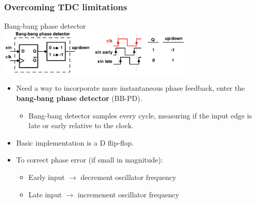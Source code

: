 \documentclass[t, screen, aspectratio=43]{beamer}
\begin{document}
\begin{frame}
	\frametitle{Overcoming TDC limitations}
	\begin{block}{Bang-bang phase detector}
		\vspace{-0.5em}
		\center\includegraphics[width=0.7\textwidth, angle=0]{bang_bang3.pdf}
		\begin{itemize}
			\scriptsize
			\item Need a way to incorporate more instantaneous phase feedback, enter the \textbf{bang-bang phase detector} (BB-PD).
			\begin{itemize}
				\scriptsize
				\item Bang-bang detector samples every cycle, measuring if the input edge is late or early relative to the clock. 
			\end{itemize}	
			\item Basic implementation is a D flip-flop.
			\item To correct phase error (if small in magnitude):
			\begin{itemize}
				\scriptsize
				\item Early input $\rightarrow$ decrement oscillator frequency
				\item Late input $\rightarrow$ incremenent oscillator frequency
			\end{itemize}
		\end{itemize} 
	\end{block}
\end{frame}
\end{document}
